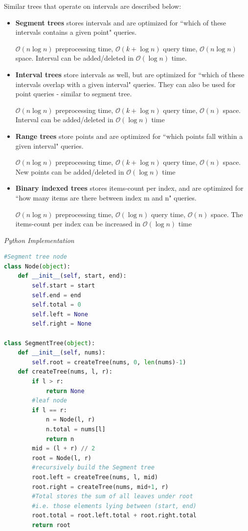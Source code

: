\documentclass{article}
\newcommand{\bigO}{\mathcal{O}}
\begin{document}
    Similar trees that operate on intervals  are described below:
    \begin{itemize}
        \item \textbf{Segment trees} stores intervals and are optimized for ``which of these intervals contains a given point" queries.
        
        $\bigO(n \log n)$ preprocessing time, $\bigO(k+\log n)$ query time, $\bigO(n \log n)$ space. Interval can be added/deleted in $\bigO(\log n)$ time.
        
        \item \textbf{Interval trees} store intervals as well, but are optimized for ``which of these intervals overlap with a given interval" queries. They can also be used for point queries - similar to segment tree.
        
        $\bigO(n \log n)$ preprocessing time, $\bigO(k+\log n)$ query time, $\bigO(n)$ space. Interval can be added/deleted in $\bigO(\log n)$ time
        
        \item \textbf{Range trees} store points and are optimized for ``which points fall within a given interval" queries.
        
         $\bigO(n \log n)$ preprocessing time, $\bigO(k+\log n)$ query time, $\bigO(n)$ space. New points can be added/deleted in $\bigO(\log n)$ time
        
        \item \textbf{Binary indexed trees} stores items-count per index, and are optimized for ``how many items are there between index m and n" queries.
        
        $\bigO(n \log n)$ preprocessing time, $\bigO(\log n)$ query time, $\bigO(n)$ space. The items-count per index can be increased in $\bigO(\log n)$ time
    \end{itemize}


\vspace{8pt} \emph{Python Implementation}
\begin{lstlisting}[language=Python]
#Segment tree node
class Node(object):
    def __init__(self, start, end):
        self.start = start
        self.end = end
        self.total = 0
        self.left = None
        self.right = None
        
class SegmentTree(object):
    def __init__(self, nums):
        self.root = createTree(nums, 0, len(nums)-1)
    def createTree(nums, l, r):
        if l > r:
            return None
        #leaf node
        if l == r:
            n = Node(l, r)
            n.total = nums[l]
            return n
        mid = (l + r) // 2
        root = Node(l, r)
        #recursively build the Segment tree
        root.left = createTree(nums, l, mid)
        root.right = createTree(nums, mid+1, r)
        #Total stores the sum of all leaves under root
        #i.e. those elements lying between (start, end)
        root.total = root.left.total + root.right.total
        return root
\end{lstlisting}    
\end{document}
